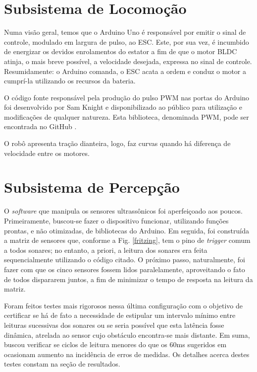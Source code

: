 \section{Subsistema de Locomoção}
Numa visão geral, temos que o Arduino Uno é responsável por emitir o sinal de controle, modulado em largura de pulso, ao ESC.
Este, por sua vez, é incumbido de energizar os devidos enrolamentos do estator a fim de que o motor BLDC atinja, o mais breve possível, a velocidade 
desejada, expressa no sinal de controle. 
Resumidamente: o Arduino comanda, o ESC acata a ordem e conduz o motor a cumprí-la utilizando os recursos da bateria.

O código fonte responsável pela produção do pulso PWM nas portas do Arduino foi desenvolvido por Sam Knight e disponibilizado ao público para 
utilização e modificações de qualquer natureza.
Esta biblioteca, denominada PWM, pode ser encontrada no GitHub \cite{pwm_lib}.

O robô apresenta tração dianteira, logo, faz curvas quando há diferença de velocidade entre os motores.

\section{Subsistema de Percepção}
O \textit{software} que manipula os sensores ultrassônicos foi aperfeiçoado aos poucos.
Primeiramente, buscou-se fazer o dispositivo funcionar, utilizando funções prontas, e não otimizadas, de bibliotecas do Arduino.
Em seguida, foi construída a matriz de sensores que, conforme a Fig. \ref{fritzing}, tem o pino de \textit{trigger} comum a todos sonares; no 
entanto, a priori, a leitura dos sonares era feita sequencialmente utilizando o código citado.
O próximo passo, naturalmente, foi fazer com que os cinco sensores fossem lidos paralelamente, aproveitando o fato de todos dispararem juntos, a fim 
de minimizar o tempo de resposta na leitura da matriz.

Foram feitos testes mais rigorosos nessa última configuração com o objetivo de certificar se há de fato a necessidade de estipular um intervalo 
mínimo entre leituras sucessivas dos sonares ou se seria possível que esta latência fosse dinâmica, atrelada ao sensor cujo obstáculo encontra-se mais 
distante.
Em suma, buscou verificar se ciclos de leitura menores do que os 60ms sugeridos em \cite{HC-SR04} ocasionam aumento na incidência de erros de 
medidas. 
Os detalhes acerca destes testes constam na seção de resultados.

